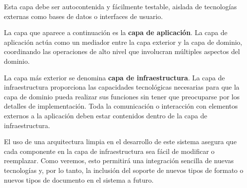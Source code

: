 Esta capa debe ser autocontenida y fácilmente testable, aislada de tecnologías externas como bases de datos o
interfaces de usuario.

La capa que aparece a continuación es la \textbf{capa de aplicación}.
La capa de aplicación actúa como un mediador entre la capa exterior y la capa de dominio, coordinando las operaciones
de alto nivel que involucran múltiples aspectos del dominio.

La capa más exterior se denomina \textbf{capa de infraestructura}.
La capa de infraestructura proporciona las capacidades tecnológicas necesarias para que la capa de dominio pueda
realizar sus funciones sin tener que preocuparse por los detalles de implementación.
Toda la comunicación o interacción con elementos externos a la aplicación deben estar contenidos dentro de la capa de
infraestructura.

El uso de una arquitectura limpia en el desarrollo de este sistema asegura que cada componente en la capa de
infraestructura sea fácil de modificar o reemplazar.
Como veremos, esto permitirá una integración sencilla de nuevas tecnologías y, por lo tanto, la inclusión del soporte
de nuevos tipos de formato o nuevos tipos de documento en el sistema a futuro.
